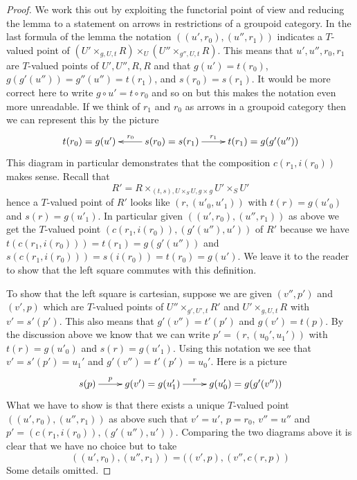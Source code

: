 \documentclass{stacks-project}
\theoremstyle{plain}
\theoremstyle{definition}
\theoremstyle{remark}
\numberwithin{equation}{subsection}
\begin{document}
\begin{proof}
We work this out by exploiting the functorial point of view
and reducing the lemma to a statement on arrows in restrictions
of a groupoid category. In the last formula of the lemma the
notation $((u', r_0), (u'', r_1))$ indicates a $T$-valued point of
$(U' \times_{g, U, t} R) \times_U (U'' \times_{g'', U, t} R)$.
This means that $u', u'', r_0, r_1$ are $T$-valued points of $U', U'', R, R$
and that $g(u') = t(r_0)$, $g(g'(u'')) = g''(u'') = t(r_1)$, and
$s(r_0) = s(r_1)$. It would be more correct here to write
$g \circ u' = t \circ r_0$ and so on but this makes the notation
even more unreadable. If we think of $r_1$ and $r_0$ as arrows in
a groupoid category then we can represent this by the picture
$$
\xymatrix{
t(r_0) = g(u') &
s(r_0) = s(r_1) \ar[l]_{r_0} \ar[r]^-{r_1} &
t(r_1) = g(g'(u''))
}
$$
This diagram in particular demonstrates that the composition
$c(r_1, i(r_0))$ makes sense. Recall that
$$
R' = R \times_{(t, s), U \times_S U, g \times g} U' \times_S U'
$$
hence a $T$-valued point of $R'$ looks like $(r, (u'_0, u'_1))$
with $t(r) = g(u'_0)$ and $s(r) = g(u'_1)$. In particular given
$((u', r_0), (u'', r_1))$ as above we get the $T$-valued point
$(c(r_1, i(r_0)), (g'(u''), u'))$ of $R'$ because we have
$t(c(r_1, i(r_0))) = t(r_1) = g(g'(u''))$ and
$s(c(r_1, i(r_0))) = s(i(r_0)) = t(r_0) = g(u')$.
We leave it to the reader to show that the left square commutes
with this definition.

\medskip\noindent
To show that the left square is cartesian,
suppose we are given $(v'', p')$ and $(v', p)$ which are $T$-valued points of
$U'' \times_{g', U', t} R'$ and $U' \times_{g, U, t} R$ with
$v' = s'(p')$. This also means that $g'(v'') = t'(p')$ and
$g(v') = t(p)$. By the discussion above we know that we can write
$p' = (r, (u_0', u_1'))$ with $t(r) = g(u'_0)$ and
$s(r) = g(u'_1)$. Using this notation we see that
$v' = s'(p') = u_1'$ and
$g'(v'') = t'(p') = u_0'$. Here is a picture
$$
\xymatrix{
s(p) \ar[r]^-p &
g(v') = g(u'_1) \ar[r]^-r &
g(u'_0) = g(g'(v''))
}
$$
What we have to show is that there exists a unique $T$-valued point
$((u', r_0), (u'', r_1))$ as above such that
$v' = u'$, $p = r_0$, $v'' = u''$ and $p' = (c(r_1, i(r_0)), (g'(u''), u'))$.
Comparing the two diagrams above it is clear that we have no choice
but to take
$$
((u', r_0), (u'', r_1)) = ((v', p), (v'', c(r, p))
$$
Some details omitted.
\end{proof}
\end{document}
